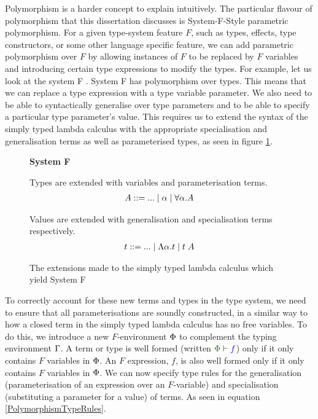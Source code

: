 \documentclass{Report}
\begin{document}
Polymorphism is a harder concept to explain intuitively. The particular flavour of polymorphism that this dissertation discusses is System-F-Style parametric polymorphism. For a given type-system feature $F$, such as types, effects, type constructors, or some other language specific feature, we can add parametric polymorphism over $F$ by allowing instances of $F$ to be replaced by $F$ variables and introducing certain type expressions to modify the types. For example, let us look at the system F . System F has polymorphism over types. This means that we can replace a type expression with a type variable parameter. We also need to be able to syntactically generalise over type parameters and to be able to specify a particular type parameter's value. This requires us to extend the syntax of the simply typed lambda calculus with the appropriate specialisation and generalisation terms as well as parameterised types, as seen in figure \ref{SystemFTermsTypes}.

\begin{figure}
    \begin{framed}
        \centering
        \textbf{System F}

        Types are extended with variables and parameterisation terms.
        \begin{align*}
            A \gens ... \mid \a\mid \all{\a}{A}
        \end{align*}

        Values are extended with generalisation and specialisation terms respectively.
        \begin{align*}
            t \gens ... \mid \elam{\a}{t}\mid \eapp{t}{A}
        \end{align*}
    \end{framed}
    \caption{The extensions made to the simply typed lambda calculus which yield System F}
    \label{SystemFTermsTypes}
\end{figure}

To correctly account for these new terms and types in the type system, we need to ensure that all parameterisations are soundly constructed, in a similar way to how a closed term in the simply typed lambda calculus has no free variables. To do this, we introduce a new $F$-environment $\P$ to complement the typing environment $\G$. A term or type is well formed (written $\wellformed{\P}{f}$) only if it only contains $F$ variables in $\P$. An $F$ expression, $f$, is also well formed only if it only contains $F$ variables in $\P$. We can now specify type rules for the generalisation (parameterisation of an expression over an $F$-variable) and specialisation (substituting a parameter for a value) of terms. As seen in equation \ref{PolymorphismTypeRules}.
\end{document}

